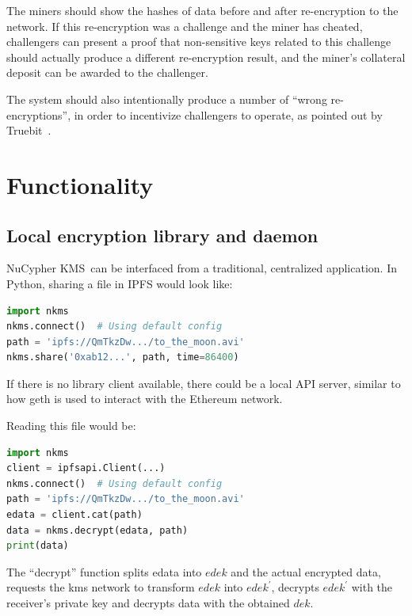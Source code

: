\documentclass[notitlepage,longbibliography]{revtex4-1}
\newcommand{\kms}{NuCypher KMS}
\begin{document}
The miners should show the hashes of data before and after re-encryption to the network.
If this re-encryption was a challenge and the miner has cheated, challengers can present a proof that non-sensitive keys related to this challenge should actually
produce a different re-encryption result, and the miner's collateral deposit can be awarded to the challenger.

The system should also intentionally produce a number of ``wrong re-encryptions'', in order to incentivize challengers to operate, as pointed out by
Truebit~\cite{truebit}.

\section{Functionality}

\subsection{Local encryption library and daemon}

\kms~can be interfaced from a traditional, centralized application.
In Python, sharing a file in IPFS would look like:
\begin{lstlisting}[frame=single,language=Python]
import nkms
nkms.connect()  # Using default config
path = 'ipfs://QmTkzDw.../to_the_moon.avi'
nkms.share('0xab12...', path, time=86400)
\end{lstlisting}
If there is no library client available, there could be a local API server, similar to how geth is used to interact with the Ethereum network.

Reading this file would be:
\begin{lstlisting}[frame=single,language=Python]
import nkms
client = ipfsapi.Client(...)
nkms.connect()  # Using default config
path = 'ipfs://QmTkzDw.../to_the_moon.avi'
edata = client.cat(path)
data = nkms.decrypt(edata, path)
print(data)
\end{lstlisting}
The ``decrypt'' function splits edata into $edek$ and the actual encrypted data,
requests the kms network to transform $edek$ into $edek^{\prime}$,
decrypts $edek^{\prime}$ with the receiver's private key and
decrypts data with the obtained $dek$.
\end{document}

